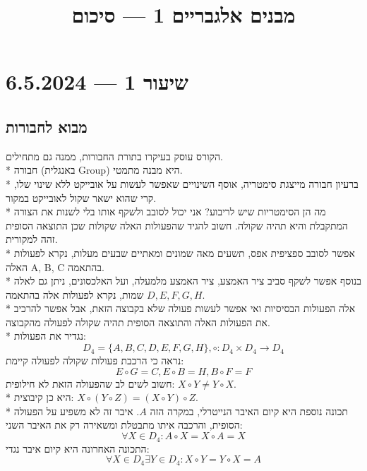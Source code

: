 
\title{מבנים אלגבריים 1 --- סיכום}
\setcounter{secnumdepth}{2}

\hypersetup{}

\maketitle
\maketitleprint{}

\tableofcontents

\section{שיעור 1 --- 6.5.2024}
\subsection{מבוא לחבורות}
הקורס עוסק בעיקרו בתורת החבורות, ממנה גם מתחילים. \\*
חבורה (באנגלית Group) היא מבנה מתמטי. \\*
ברעיון חבורה מייצגת סימטריה, אוסף השינויים שאפשר לעשות על אובייקט ללא שינוי שלו, קרי שהוא ישאר שקול לאובייקט במקור. \\*
מה הן הסימטריות שיש לריבוע? אני יכול לסובב ולשקף אותו בלי לשנות את הצורה המתקבלת והיא תהיה שקולה. חשוב להגיד שהפעולות האלה שקולות שכן התוצאה הסופית זהה למקורית. \\*
אפשר לסובב ספציפית אפס, תשעים מאה שמונים ומאתיים שבעים מעלות, נקרא לפעולות האלה A, B, C בהתאמה. \\*
בנוסף אפשר לשקף סביב ציר האמצע, ציר האמצע מלמעלה, ועל האלכסונים, ניתן גם לאלה שמות, נקרא לפעולות אלה בהתאמה $D, E, F, G, H$. \\*
אלה הפעולות הבסיסיות ואי אפשר לעשות פעולה שלא בקבוצה הזאת, אבל אפשר להרכיב את הפעולות האלה והתוצאה הסופית תהיה שקולה לפעולה מהקבוצה. \\*
נגדיר את הפעולות:
\[
	D_4 = \{ A, B, C, D, E, F, G, H \},
	\circ : D_4 \times D_4 \to D_4
\]
נראה כי הרכבת פעולות שקולה לפעולה קיימת:
\[
	E \circ G = C,
	E \circ B = H,
	B \circ F = F
\]
חשוב לשים לב שהפעולה הזאת לא חילופית: $X \circ Y \ne Y \circ X$. \\*
היא כן קיבוצית: $X \circ (Y \circ Z) = (X \circ Y) \circ Z$. \\*
תכונה נוספת היא קיום האיבר הנייטרלי, במקרה הזה $A$. איבר זה לא משפיע על הפעולה הסופית, והרכבה איתו מתבטלת ומשאירה רק את האיבר השני:
\[
	\forall X \in D_4 : A \circ X = X \circ A = X
\]
התכונה האחרונה היא קיום איבר נגדי:
\[
	\forall X \in D_4 \exists Y \in D_4 : X \circ Y = Y \circ X = A
\]

